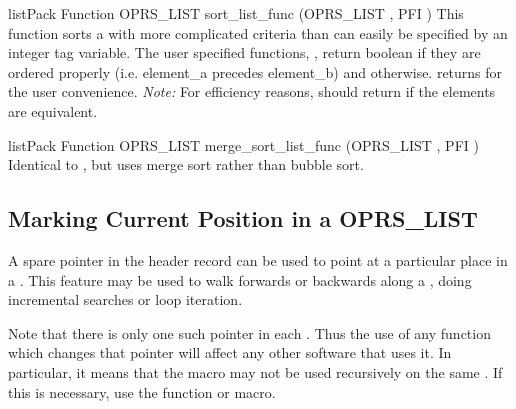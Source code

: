 \begin{typefn}{listPack Function} {OPRS\_LIST} {sort\_list\_func} {(OPRS\_LIST ,
PFI )} This function sorts a  with more complicated
criteria than can easily be specified by an integer tag variable. The user
specified functions,
, return boolean
 if they are ordered properly (i.e. element\_a precedes
element\_b) and  otherwise.
 returns 
for the user convenience.
\emph{Note:} For efficiency reasons,  should return
 if
the elements are equivalent.
\end{typefn}

\begin{typefn}{listPack Function} {OPRS\_LIST} {merge\_sort\_list\_func} {(OPRS\_LIST
, PFI )}
Identical to , but uses merge sort rather than bubble
sort.
\end{typefn}

\subsection{Marking Current Position in a OPRS\_LIST}

A spare pointer in the  header record can be used
to point at a particular place in a .  This feature may be used
to walk forwards or backwards along a , doing incremental
searches or loop iteration.

Note that there is only one such pointer in each .  Thus the use of
any function which changes that pointer will affect any other software that
uses it.  In particular, it means that the
 macro may not be used recursively on the
same .  If this is necessary, use the  function
or  macro.

